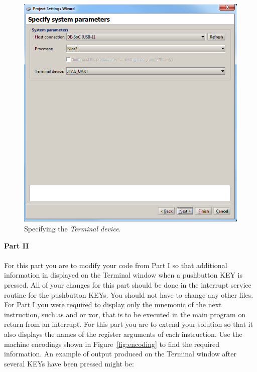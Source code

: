 \documentclass[epsfig,10pt,fullpage]{article}
\begin{document}
\begin{figure}[htb]
	\begin{center}
	\includegraphics[scale=0.58]{figures/terminal.png}
	\end{center}
	\vspace{-0.25cm}\caption{Specifying the {\it Terminal device}.}
\label{fig:terminal}
\end{figure}

\noindent
{\bf Part II}
~\\
~\\
For this part you are to modify your code from Part I so that additional information in
displayed on the Terminal window when a pushbutton KEY is pressed. All of your changes for
this part should be done in the interrupt service routine for the pushbutton KEYs. You
should not have to change any other files. For Part I you were required to display only 
the mnemonic of the next instruction, such as {\sf and} or {\sf xor}, that is to be executed in the
main program on return from an interrupt. For this part you are to extend your solution
so that it also displays the names of the register arguments of each instruction. Use the
machine encodings shown in Figure~\ref{fig:encoding} to find the required information. An 
example of output produced on the Terminal window after several KEYs have been pressed
might be:
\end{document}
